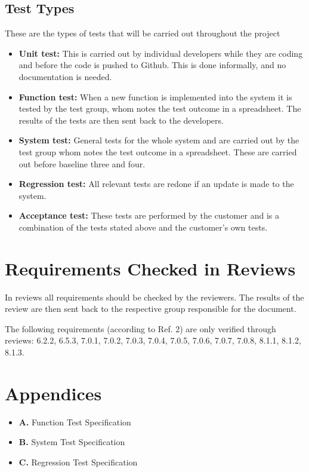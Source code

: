 \documentclass{article}
\begin{document}
		\subsection{Test Types}
		
These are the types of tests that will be carried out throughout the project


\begin{itemize}
  \item \textbf{Unit test:} This is carried out by individual developers while they are coding and before the code is pushed to Github. This is done informally, and no documentation is needed.
  
  \item \textbf{Function test:} When a new function is implemented into the system it is tested by the test group, whom notes the test outcome in a spreadsheet. The results of the tests are then sent back to the developers.
  
   \item \textbf{System test:} General tests for the whole system and are carried out by the test group whom notes the test outcome in a spreadsheet. These are carried out before baseline three and four.
   
      \item \textbf{Regression test:} All relevant tests are redone if an update is made to the system.
      
         \item \textbf{Acceptance test:} These tests are performed by the customer and is a combination of the tests stated above and the customer's own tests.
\end{itemize}


\section{Requirements Checked in Reviews}
In reviews all requirements should be checked by the reviewers. The results of the review are then sent back to the respective group responsible for the document.

The following requirements (according to Ref. 2) are only verified through
reviews: 6.2.2, 6.5.3, 7.0.1, 7.0.2, 7.0.3, 7.0.4, 7.0.5, 7.0.6, 7.0.7, 7.0.8, 8.1.1, 8.1.2, 8.1.3.


\section{Appendices}
	\begin{itemize}
		\item \textbf{A.} Function Test Specification 
		\item \textbf{B.} System Test Specification 	
		\item \textbf{C.} Regression Test Specification 
		\end{itemize}
	
\end{document}
